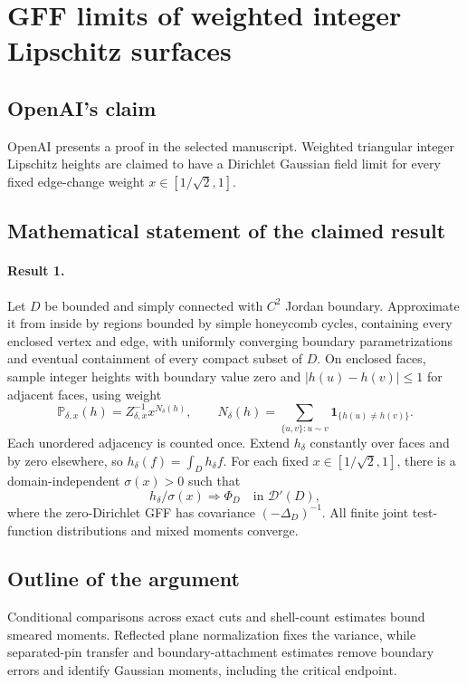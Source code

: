 \documentclass[11pt]{article}
\begin{document}
\section*{GFF limits of weighted integer Lipschitz surfaces}

\subsection{OpenAI's claim}
OpenAI presents a proof in the selected manuscript. Weighted triangular integer Lipschitz heights are claimed to have a Dirichlet Gaussian field limit for every fixed edge-change weight $x\in[1/\sqrt2,1]$.

\subsection{Mathematical statement of the claimed result}
\paragraph{Result 1.} Let $D$ be bounded and simply connected with $C^2$ Jordan boundary. Approximate it from inside by regions bounded by simple honeycomb cycles, containing every enclosed vertex and edge, with uniformly converging boundary parametrizations and eventual containment of every compact subset of $D$. On enclosed faces, sample integer heights with boundary value zero and $|h(u)-h(v)|\le1$ for adjacent faces, using weight
\[
 \mathbb P_{\delta,x}(h)=Z_{\delta,x}^{-1}x^{N_\delta(h)},\qquad
 N_\delta(h)=\sum_{\{u,v\}:u\sim v}\mathbf1_{\{h(u)\ne h(v)\}}.
\]
Each unordered adjacency is counted once. Extend $h_\delta$ constantly over faces and by zero elsewhere, so $h_\delta(f)=\int_Dh_\delta f$. For each fixed $x\in[1/\sqrt2,1]$, there is a domain-independent $\sigma(x)>0$ such that
\[
 h_\delta/\sigma(x)\Longrightarrow\Phi_D\quad\text{in }\mathcal D'(D),
\]
where the zero-Dirichlet GFF has covariance $(-\Delta_D)^{-1}$. All finite joint test-function distributions and mixed moments converge.

\subsection{Outline of the argument}
Conditional comparisons across exact cuts and shell-count estimates bound smeared moments. Reflected plane normalization fixes the variance, while separated-pin transfer and boundary-attachment estimates remove boundary errors and identify Gaussian moments, including the critical endpoint.
\end{document}
